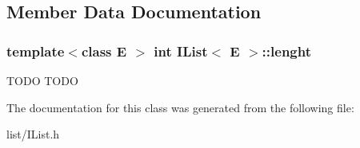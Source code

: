 \subsection{Member Data Documentation}
\hypertarget{class_i_list_a64ce981ba1104bbb482068983cb5a3bc}{
\subsubsection[{lenght}]{\setlength{\rightskip}{0pt plus 5cm}template$<$class E $>$ int {\bf I\-List}$<$ E $>$\-::lenght\hspace{0.3cm}{\ttfamily [protected]}}}\label{class_i_list_a64ce981ba1104bbb482068983cb5a3bc}
T\-O\-D\-O T\-O\-D\-O 

The documentation for this class was generated from the following file\-:\begin{DoxyCompactItemize}
\item 
list/I\-List.\-h\end{DoxyCompactItemize}
